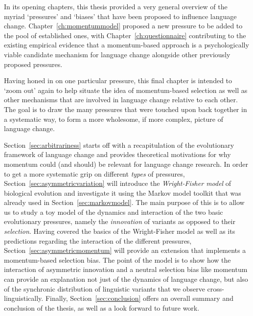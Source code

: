
In its opening chapters, this thesis provided a very general overview of the myriad `pressures' and `biases' that have been proposed to influence language change. Chapter~\ref{ch:momentummodel} proposed a new pressure to be added to the pool of established ones, with Chapter~\ref{ch:questionnaire} contributing to the existing empirical evidence that a momentum-based approach is a psychologically viable candidate mechanism for language change alongside other previously proposed pressures.

Having honed in on one particular pressure, this final chapter is intended to `zoom out' again to help situate the idea of momentum-based selection as well as other mechanisms that are involved in language change relative to each other. %
The goal is to draw the many pressures that were touched upon back together in a systematic way, to form a more wholesome, if more complex, picture of language change. %

Section~\ref{sec:arbitrariness} starts off with a recapitulation of the evolutionary framework of language change and provides theoretical motivations for why momentum could (and should) be relevant for language change research.
In order to get a more systematic grip on different \emph{types} of pressures, Section~\ref{sec:asymmetricvariation} will introduce the \emph{Wright-Fisher model} of biological evolution and investigate it using the Markov model toolkit that was already used in Section~\ref{sec:markovmodel}. The main purpose of this is to allow us to study a toy model of the dynamics and interaction of the two basic evolutionary pressures, namely the \emph{innovation} of variants as opposed to their \emph{selection}. Having covered the basics of the Wright-Fisher model as well as its predictions regarding the interaction of the different pressures, Section~\ref{sec:asymmetricmomentum} will provide an extension that implements a momentum-based selection bias. The point of the model is to show how the interaction of asymmetric innovation and a neutral selection bias like momentum can provide an explanation not just of the dynamics of language change, but also of the synchronic distribution of linguistic variants that we observe cross-linguistically.
Finally, Section~\ref{sec:conclusion} offers an overall summary and conclusion of the thesis, as well as a look forward to future work.

